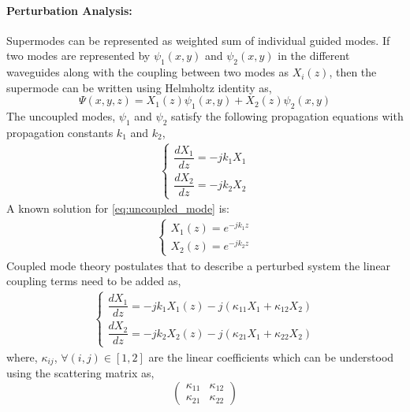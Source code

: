 \documentclass[../report.tex]{subfiles}
\begin{document}
\paragraph*{Perturbation Analysis:}
Supermodes can be represented as weighted sum of individual guided modes. If two modes are represented by $\psi_1(x,y)$ and $\psi_2(x,y)$ in the different waveguides along with the coupling between two modes as $X_i(z)$, then the supermode can be written using Helmholtz identity as, 
\begin{equation}\label{eq:supermodes}
	\Psi(x,y,z) = X_1(z)\psi_1(x,y) + X_2(z)\psi_2(x,y)
\end{equation} 	
The uncoupled modes, $\psi_1$ and $\psi_2$ satisfy the following propagation equations with propagation constants $k_1$ and $k_2$,
\begin{equation}\label{eq:uncoupled_mode}
\begin{aligned}
\begin{cases}
\dfrac {dX_{1}} {dz}=-jk_{1}X_{1} \\[10pt]
\dfrac {dX_{2}} {dz}=-jk_{2}X_{2}
\end{cases}
\end{aligned}
\end{equation}
A known solution for \ref{eq:uncoupled_mode} is:
\begin{equation}\label{eq:uncoupled_mode_sol}
\begin{aligned}
\begin{cases}
X_{1} (z) = e ^ {-jk_{1}z} \\
X_{2} (z) = e ^ {-jk_{2}z}
\end{cases}
\end{aligned}
\end{equation}
Coupled mode theory postulates that to describe a perturbed system the linear coupling terms need to be added as,
\begin{equation}\label{eq:coupled_mode_sol}
\begin{aligned}
\begin{cases}
\dfrac {dX_{1}} {dz} = -jk_{1}X_{1}(z) - j(\kappa_{11}X_1+\kappa_{12}X_2) \\[10pt]
\dfrac {dX_{2}} {dz} = -jk_{2}X_{2}(z) - j(\kappa_{21}X_1+\kappa_{22}X_2)
\end{cases}
\end{aligned}
\end{equation}
where, $\kappa_{ij}$, $\forall \left( i,j\right) \in \left[ 1,2\right] $  are the linear coefficients which can be understood using the scattering matrix as,
\begin{equation}\label{eq:scattering_matix_coupler}
\left(\begin{matrix} 
\kappa_{11} & \kappa_{12} \\ 
\kappa_{21} & \kappa_{22}
\end{matrix} \right) 
\end{equation} 
\end{document}
